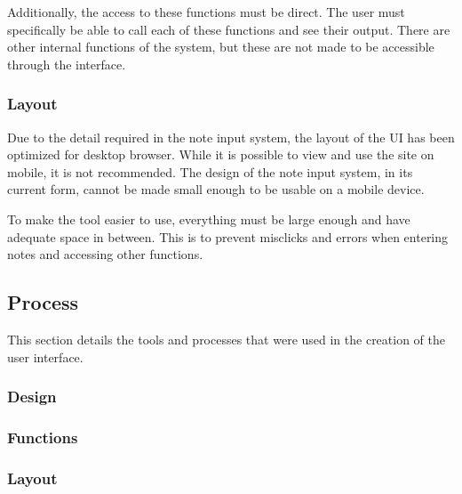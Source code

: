 \vspace{\baselineskip}

Additionally, the access to these functions must be direct.  The user must specifically be able to call each of these functions and see their output.  There are other internal functions of the system, but these are not made to be accessible through the interface.

\subsubsection{Layout}
\label{subsubsec:methodologylayout}

Due to the detail required in the note input system, the layout of the UI has been optimized for desktop browser.  While it is possible to view and use the site on mobile, it is not recommended.  The design of the note input system, in its current form, cannot be made small enough to be usable on a mobile device.

\vspace{\baselineskip}

To make the tool easier to use, everything must be large enough and have adequate space in between.  This is to prevent misclicks and errors when entering notes and accessing other functions.

\subsection{Process}
\label{subsec:process}

This section details the tools and processes that were used in the creation of the user interface.

\subsubsection{Design}
\label{subsubsec:processdesign}



\subsubsection{Functions}
\label{subsubsec:processfunctions}



\subsubsection{Layout}
\label{subsubsec:processlayout}

